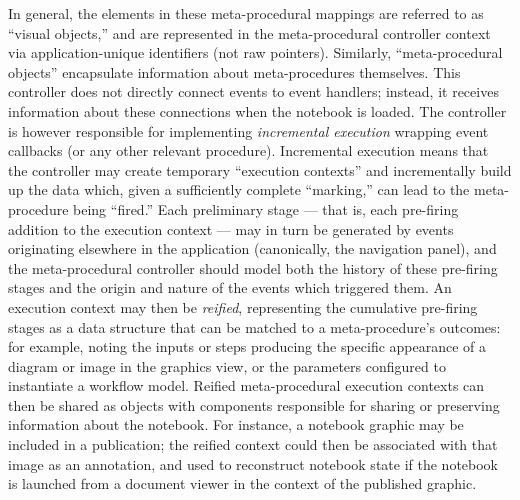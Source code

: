 \documentclass[11pt,letterpaper]{article}
\newcommand{\GUI}{\resizebox{!}{7pt}{\AcronymText{GUI}}}
\newcommand{\textscc}[1]{{\color{orr!35!black}{{%
						\fontfamily{Cabin-TLF}\fontseries{b}\selectfont{\textsc{\scriptsize{#1}}}}}}}
\newcommand{\AcronymText}[1]{{\textscc{#1}}}
\newcommand{\p}[1]{

\vspace{1em}#1}
\newcommand{\q}[1]{{\fontfamily{qcr}\selectfont ``}#1{\fontfamily{qcr}\selectfont ''}}
\begin{document}
{\p{In general, the \GUI{} elements in these 
meta-procedural mappings are referred to as 
\q{visual objects,} and are represented 
in the meta-procedural controller context via 
application-unique identifiers (not raw pointers).  
Similarly, \q{meta-procedural objects} encapsulate 
information about meta-procedures themselves.  
This controller does not directly connect 
\GUI{} events to event handlers; instead, it 
receives information about these connections when 
the notebook is loaded.  The controller is however 
responsible for implementing \textit{incremental 
execution} wrapping event callbacks (or any other 
relevant procedure).  Incremental execution 
means that the controller may create 
temporary \q{execution contexts} and incrementally 
build up the data which, given a sufficiently 
complete \q{marking,} can lead to the 
meta-procedure being \q{fired.}  Each 
preliminary stage --- that is, each pre-firing 
addition to the execution context --- may in 
turn be generated by events originating elsewhere 
in the application (canonically, the 
navigation panel), and the meta-procedural controller 
should model both the history of these pre-firing stages 
and the origin and nature of the events which 
triggered them.  An execution context 
may then be \textit{reified}, representing the 
cumulative pre-firing stages as a data structure 
that can be matched to a meta-procedure's 
outcomes: for example, noting the 
inputs or steps producing the specific appearance 
of a diagram or image in the graphics view, 
or the parameters configured to instantiate 
a workflow model.  Reified meta-procedural 
execution contexts can then be shared as 
objects with components responsible for 
sharing or preserving information about the 
notebook.  For instance, a notebook graphic may be 
included in a publication; the reified context 
could then be associated with that image as an 
annotation, and used to reconstruct notebook 
state if the notebook is launched from a 
document viewer in the context of the 
published graphic.}


}
\end{document}
